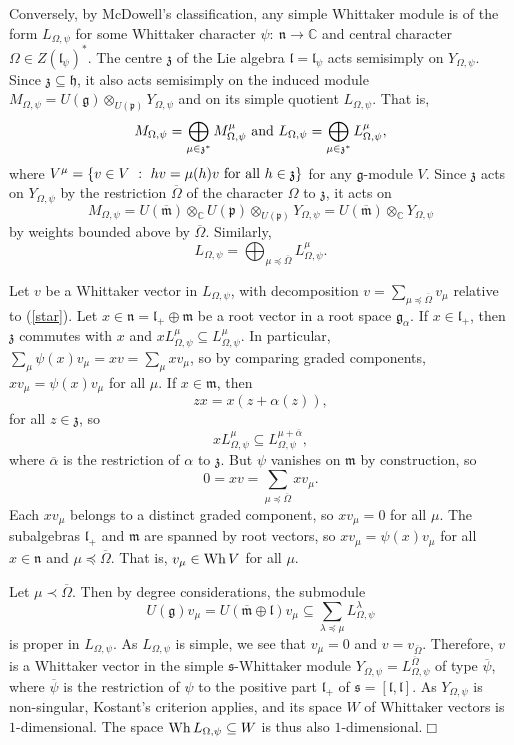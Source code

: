 \documentclass[11pt]{article}
\numberwithin{equation}{section}
\newcommand{\fg}{\mathfrak{g}}
\newcommand{\ot}{\otimes}
\newcommand{\ga}{\alpha}
\newcommand{\qed}{\hfill $\Box$}
\newcommand{\mf}{\mathfrak}
\begin{document}
  Conversely, by McDowell's classification, any simple Whittaker module is of the form $L_{\Omega,\psi}$ for some Whittaker character $\psi:\ \mathfrak{n}\rightarrow \mathbb{C}$ and central character $\Omega\in Z(\mathfrak{l}_\psi)^*$.  The centre $\mathfrak{z}$ of the Lie algebra $\mathfrak{l}=\mathfrak{l}_\psi$ acts semisimply on $Y_{\Omega,\psi}$.  Since $\mathfrak{z}\subseteq\mathfrak{h}$, it also acts semisimply on the induced module $M_{\Omega,\psi}=U(\mathfrak{g})\ot_{U(\mathfrak{p})}Y_{\Omega,\psi}$ and on its simple quotient $L_{\Omega,\psi}$.  That is,
  $$M_{\Omega,\psi}=\bigoplus_{\mu\in\mathfrak{z}^*}M_{\Omega,\psi}^\mu\hbox{\ and\ }L_{\Omega,\psi}=\bigoplus_{\mu\in\mathfrak{z}^*}L_{\Omega,\psi}^\mu,$$
  where $V^\mu=\{v\in V\ :\ hv=\mu(h)v\hbox{\ for all\ }h\in\mathfrak{z}\}$ for any $\fg$-module $V$.  Since $\mathfrak{z}$ acts on $Y_{\Omega,\psi}$ by the restriction $\overline{\Omega}$ of the character $\Omega$ to $\mathfrak{z}$, it acts on
  $$M_{\Omega,\psi}=U(\overline{\mf{m}})\ot_\mathbb{C}U(\mf{p})\ot_{U(\mf{p})}Y_{\Omega,\psi}=U(\overline{\mf{m}})\ot_\mathbb{C} Y_{\Omega,\psi}$$
  by weights bounded above by $\overline{\Omega}$.  Similarly, 
\begin{equation}\label{star}
  L_{\Omega,\psi}=\bigoplus_{\mu\preceq\overline{\Omega}}L_{\Omega,\psi}^\mu.
\end{equation}

Let $v$ be a Whittaker vector in $L_{\Omega,\psi}$, with decomposition $v=\sum_{\mu\preceq\overline{\Omega}}v_\mu$ relative to (\ref{star}).  Let $x\in\mf{n}=\mf{l}_+\oplus\mf{m}$ be a root vector in a root space $\fg_\ga$.  If $x\in\mf{l}_+$, then $\mf{z}$ commutes with $x$ and $xL_{\Omega,\psi}^\mu\subseteq L_{\Omega,\psi}^\mu$.  In particular, $\sum_\mu\psi(x)v_\mu=xv=\sum_\mu xv_\mu$, so by comparing graded components, $xv_\mu=\psi(x)v_\mu$ for all $\mu$.  If $x\in\mf{m}$, then
$$zx=x(z+\ga(z)),$$
for all $z\in\mf{z}$, so
$$xL_{\Omega,\psi}^\mu\subseteq L_{\Omega,\psi}^{\mu+\overline{\ga}},$$
where $\overline{\ga}$ is the restriction of $\ga$ to $\mf{z}$.  But $\psi$ vanishes on $\mf{m}$ by construction, so
$$0=xv=\sum_{\mu\preceq\overline{\Omega}}xv_\mu.$$
Each $xv_\mu$ belongs to a distinct graded component, so $xv_\mu=0$ for all $\mu$.  The subalgebras $\mf{l}_+$ and $\mf{m}$ are spanned by root vectors, so $xv_\mu=\psi(x)v_\mu$ for all $x\in\mf{n}$ and $\mu\preceq\overline{\Omega}$.  That is, $v_\mu\in\hbox{Wh}\,V$ for all $\mu$.

Let $\mu\prec\overline{\Omega}$.  Then by degree considerations, the submodule
$$U(\fg)v_\mu=U(\overline{\mf{m}}\oplus\mf{l})v_\mu\subseteq\sum_{\lambda\preceq\mu}L_{\Omega,\psi}^\lambda$$
is proper in $L_{\Omega,\psi}$.  As $L_{\Omega,\psi}$ is simple, we see that $v_\mu=0$ and $v=v_{\overline{\Omega}}$.  Therefore, $v$ is a Whittaker vector in the simple $\mf{s}$-Whittaker module $Y_{\Omega,\psi}=L_{\Omega,\psi}^{\overline{\Omega}}$ of type $\overline{\psi}$, where $\overline{\psi}$ is the restriction of $\psi$ to the positive part $\mf{l}_+$ of $\mf{s}=[\mf{l},\mf{l}]$.  As $Y_{\Omega,\psi}$ is non-singular, Kostant's criterion \cite[Theorem 3.6.1]{kostant78} applies, and its space $W$ of Whittaker vectors is $1$-dimensional.  The space $\hbox{Wh}\,L_{\Omega,\psi}\subseteq W$ is thus also $1$-dimensional.\qed
\end{document}
